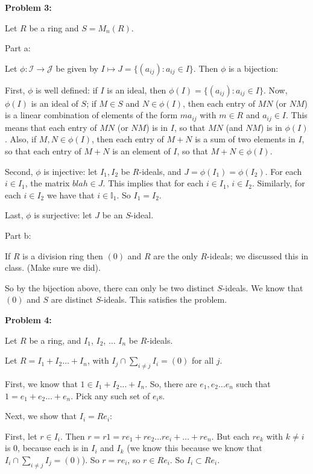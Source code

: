 \documentclass[a4paper,12pt]{article}
\newcommand{\tab}{\hspace{4mm}} %
\newcommand{\shunt}{\vspace{20mm}}
\newcommand{\I}{\mathbb{I}}
\newcommand{\scrI}{\mathcal{I}}
\newcommand{\scrJ}{\mathcal{J}}
\begin{document}
\shunt

{\bf Problem 3:} %

Let $R$ be a ring and $S=M_n(R)$.

Part a:

Let $\phi: \scrI \to \scrJ$ be given by $I \mapsto J=\{(a_{ij}) : a_{ij} \in I\}$. Then $\phi$ is a bijection:

First, $\phi$ is well defined: if $I$ is an ideal, then $\phi(I) = \{(a_{ij}) : a_{ij} \in I\}$. Now, $\phi(I)$ is an ideal of $S$; if $M \in S$ and $N \in \phi(I)$, then each entry of $MN$ (or $NM$) is a linear combination of elements of the form $ma_{ij}$ with $m \in R$ and $a_{ij} \in I$. This means that each entry of $MN$ (or $NM$) is in $I$, so that $MN$ (and $NM$) is in $\phi(I)$. Also, if $M,N \in \phi(I)$, then each entry of $M+N$ is a sum of two elements in $I$, so that each entry of $M+N$ is an element of $I$, so that $M+N \in \phi(I)$.

Second, $\phi$ is injective: let $I_1,I_2$ be $R$-ideals, and $J=\phi(I_1)=\phi(I_2)$. For each $i \in I_1$, the matrix $blah \in J$. This implies that for each $i \in I_1$, $i \in I_2$. Similarly, for each $i \in I_2$ we have that $i \in \I_1$. So $I_1 = I_2$. %

Last, $\phi$ is surjective: let $J$ be an $S$-ideal. %

\shunt

Part b:

If $R$ is a division ring then $(0)$ and $R$ are the only $R$-ideals; we discussed this in class. (Make sure we did).

So by the bijection above, there can only be two distinct $S$-ideals. We know that $(0)$ and $S$ are distinct $S$-ideals. This satisfies the problem.

\shunt

{\bf Problem 4:} %

Let $R$ be a ring, and $I_1$, $I_2$, $\ldots$ $I_n$ be $R$-ideals.

Let $R=I_1 + I_2 \ldots +I_n$, with $I_j \cap \sum\limits_{i \neq j} I_i = (0)$ for all $j$.

\tab First, we know that $1 \in I_1 + I_2 \ldots +I_n$. So, there are $e_1, e_2 \ldots e_n$ such that $1 = e_1 + e_2 \ldots + e_n$. Pick any such set of $e_i$s.

\tab Next, we show that $I_i = Re_i$:

\tab \tab First, let $r \in I_i$. Then $r=r1=re_1+re_2 \ldots re_i + \ldots +re_n$. But each $re_k$ with $k \neq i$ is $0$, because each is in $I_i$ and $I_k$ (we know this because we know that $I_i \cap \sum\limits_{i \neq j} I_j = (0)$). So $r = re_i$, so $r \in Re_i$. So $I_i \subset Re_i$.
\end{document}
